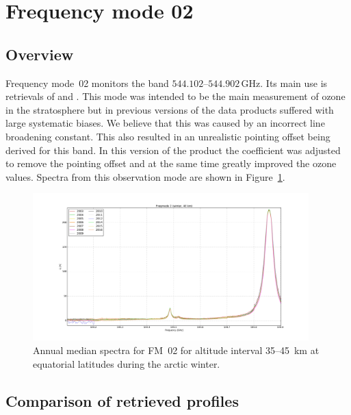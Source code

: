 \section{Frequency mode 02}
\label{sec:fm02}

\subsection{Overview}
\label{sec:fm02:overview}
Frequency mode~02 monitors the band $544.102$--$544.902\,\mathrm{GHz}$. Its
main use is retrievals of  and . This mode was intended
to be the main measurement of ozone in the stratosphere but in previous
versions of the data products suffered with large systematic biases. We
believe that this was caused by an incorrect line broadening constant. This
also resulted in an unrealistic pointing offset being derived for this band.
In this version of the product the coefficient was adjusted to remove the
pointing offset and at the same time greatly improved the ozone values.
Spectra from this observation mode are shown in Figure~\ref{fig:spectra:02}.

\begin{figure}[ht]
    \centering
    \includegraphics[width=0.95\textwidth]{../DDS/figures/spectra/fm_02_spectra_winter}
    \caption{Annual median spectra for FM~02 for altitude interval 35--45~km at
        equatorial latitudes during the arctic winter.
    }\label{fig:spectra:02}
\end{figure}


\subsection{Comparison of retrieved profiles}
\label{sec:fm02:comparison}



